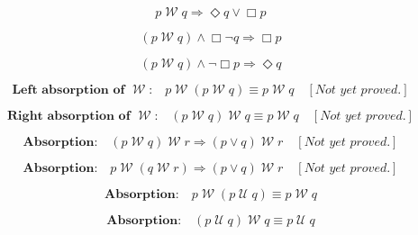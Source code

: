 \documentclass[fleqn, leqno]{article}
\newcommand{\impl}{\ensuremath{\Rightarrow}}        %
\newcommand{\Until}{\;\mathcal{U}\;}
\newcommand{\Wait}{\;\mathcal{W}\;}
\newcommand{\Event}{\Diamond}
\newcommand{\Always}{\Box}
\newcommand{\spacer}{\vspace{-30pt}}
\begin{document}
\spacer

\begin{equation}\label{E:waitEntailment}
p \Wait q \impl \Event q \lor \Always p
\end{equation}

\spacer

\begin{equation}\label{E:waitEntailAlways}
(p \Wait q) \land \Always\neg q \impl \Always p
\end{equation}

\spacer

\begin{equation}\label{E:waitEntailEvent}
(p \Wait q) \land \neg\Always p \impl \Event q
\end{equation}

\spacer

\begin{equation}\label{E:waitAbsL}
\textbf{Left absorption of $\Wait$:}\quad p \Wait (p \Wait q) \equiv p \Wait q \quad [\textit{Not yet proved.}]
\end{equation}

\spacer

\begin{equation}\label{E:waitAbsR}
\textbf{Right absorption of $\Wait$:}\quad (p \Wait q) \Wait q \equiv p \Wait q \quad [\textit{Not yet proved.}]
\end{equation}

\spacer

\begin{equation}\label{E:waitImpAbsR}
\textbf{Absorption:}\quad (p \Wait q) \Wait r \impl (p \lor q) \Wait r \quad [\textit{Not yet proved.}]
\end{equation}

\spacer

\begin{equation}\label{E:waitImpAbsL}
\textbf{Absorption:}\quad p \Wait (q \Wait r) \impl (p \lor q) \Wait r \quad [\textit{Not yet proved.}]
\end{equation}

\spacer

\begin{equation}\label{E:leftWaitAbsUtil}
\textbf{Absorption:}\quad p \Wait (p \Until q) \equiv p \Wait q
\end{equation}

\spacer

\begin{equation}\label{E:rightWaitAbsUtil}
\textbf{Absorption:}\quad (p \Until q) \Wait q \equiv p \Until q
\end{equation}
\end{document}
